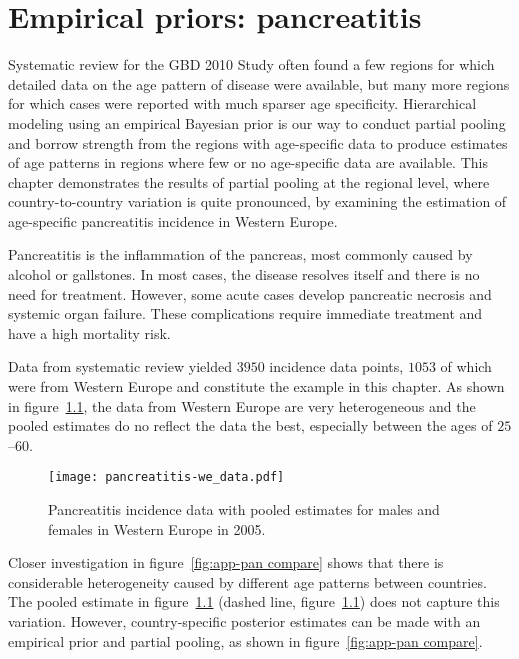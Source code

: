 \chapter{Empirical priors: pancreatitis}
\label{applications-priors_empirical}

Systematic review for the GBD 2010 Study often found a few regions for
which detailed data on the age pattern of disease were available, but
many more regions for which cases were reported with much sparser
age specificity.  Hierarchical modeling using an empirical Bayesian
prior is our way to conduct partial pooling and borrow strength from
the regions with age-specific data to produce estimates of age
patterns in regions where few or no age-specific data are
available.  This chapter demonstrates the results of partial pooling
at the regional level, where country-to-country variation is quite
pronounced, by examining the estimation of age-specific pancreatitis
incidence in Western Europe.

Pancreatitis is the inflammation of the pancreas, most commonly
caused by alcohol or gallstones.  In most cases, the disease resolves
itself and there is no need for treatment.  However, some acute
cases develop pancreatic necrosis and systemic organ failure.  These
complications require immediate treatment and have a high mortality risk.
\cite{raraty_acute_2004, banks_epidemiology_2002, sekimoto_jpn_2006}

Data from systematic review yielded $3950$ incidence data points,
$1053$ of which were from Western Europe and constitute the example
in this chapter.  As shown in figure~\ref{fig:app-pan data}, the data
from Western Europe are very heterogeneous and the pooled estimates do 
no reflect the data the best, especially between the ages of $25$--$60$.

    \begin{figure}[h]
        \begin{center}
            \texttt{[image: pancreatitis-we\_data.pdf]}
            \caption[Systematic review data for pancreatitis with estimates.]{Pancreatitis incidence data with pooled estimates for males and females in Western 
            Europe in 2005.}
            \label{fig:app-pan data}
        \end{center}
    \end{figure}

Closer investigation in figure~\ref{fig:app-pan compare} shows that there is 
considerable heterogeneity caused by different age patterns between countries.  
The pooled estimate in figure~\ref{fig:app-pan data} (dashed line, 
figure~\ref{fig:app-pan data}) does not capture this variation.  However, 
country-specific posterior estimates can be made with an empirical prior and 
partial pooling, as shown in figure~\ref{fig:app-pan compare}.

